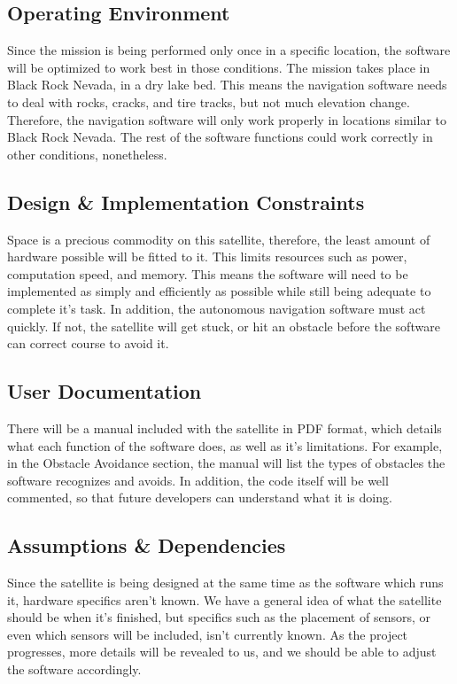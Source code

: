\documentclass[10pt,onecolumn,draftclsnofoot,document]{IEEEtran}
\begin{document}
\subsection{Operating Environment}
Since the mission is being performed only once in a specific location, the software will be optimized to work best in those conditions. The mission takes place in Black Rock Nevada, in a dry lake bed. This means the navigation software needs to deal with rocks, cracks, and tire tracks, but not much elevation change. Therefore, the navigation software will only work properly in locations similar to Black Rock Nevada. The rest of the software functions could work correctly in other conditions, nonetheless.  

\subsection{Design \& Implementation Constraints}
Space is a precious commodity on this satellite, therefore, the least amount of hardware possible will be fitted to it. This limits resources such as power, computation speed, and memory. This means the software will need to be implemented as simply and efficiently as possible while still being adequate to complete it's task. In addition, the autonomous navigation software must act quickly. If not, the satellite will get stuck, or hit an obstacle before the software can correct course to avoid it.

\subsection{User Documentation}
There will be a manual included with the satellite in PDF format, which details what each function of the software does, as well as it's limitations. For example, in the Obstacle Avoidance section, the manual will list the types of obstacles the software recognizes and avoids. In addition, the code itself will be well commented, so that future developers can understand what it is doing.

\subsection{Assumptions \& Dependencies}
Since the satellite is being designed at the same time as the software which runs it, hardware specifics aren't known. We have a general idea of what the satellite should be when it's finished, but specifics such as the placement of sensors, or even which sensors will be included, isn't currently known. As the project progresses, more details will be revealed to us, and we should be able to adjust the software accordingly.
\end{document}
